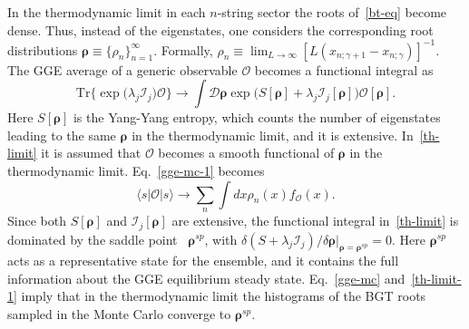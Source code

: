 \documentclass[twocolumn,superscriptaddress,prb,10pt]{revtex4-1}
\begin{document}
In the thermodynamic limit in each $n$-string sector the roots of~\eqref{bt-eq} become 
dense. Thus, instead of the eigenstates, one considers the corresponding root 
distributions $\pmb{\rho}\equiv\{\rho_n\}_{n=1}^\infty$. Formally, $\rho_n\equiv
\lim_{L\to\infty}[L(x_{n;\gamma+1}-x_{n;\gamma})]^{-1}$. The GGE average of a 
generic observable ${\mathcal O}$ becomes a functional integral as~\cite{yang-1969,mossel-2012} 
%
\begin{equation}
\label{th-limit}
\textrm{Tr}\big\{\exp\big({\lambda_j{\mathcal I}_j}\big){\mathcal O}\big\}
\rightarrow\int{\mathcal D}\pmb{\rho}\exp\big(S[\pmb{\rho}]+
\lambda_j{\mathcal I}_j[\pmb{\rho}]\big){\mathcal O}[\pmb{\rho}].
\end{equation}
%
Here $S[\pmb{\rho}]$ is the Yang-Yang entropy, which counts the number of eigenstates 
leading to the same $\pmb{\rho}$ in the thermodynamic limit, and it is extensive. 
In~\eqref{th-limit} it is assumed that ${\mathcal O}$ becomes a smooth functional 
of $\pmb{\rho}$ in the thermodynamic limit. Eq.~\eqref{gge-mc-1} becomes 
%
\begin{equation}
\label{th-limit-1}
\langle s|{\mathcal O}|s\rangle\to\sum\limits_{n}\int dx\rho_n(x)f_{{\mathcal O}}(x).
\end{equation}
%
Since both $S[\pmb{\rho}]$ and ${\mathcal I}_j[\pmb{\rho}]$ are extensive, the functional 
integral in~\eqref{th-limit} is dominated by the saddle point~\cite{mossel-2012} 
$\pmb{\rho}^{sp}$, with $\delta(S+\lambda_j{\mathcal I}_j)/\delta\pmb{\rho}|_{\pmb{\rho}=
\pmb{\rho}^{sp}}=0$. Here $\pmb{\rho}^{sp}$ acts as a representative 
state for the ensemble, and it contains the full information about the GGE equilibrium steady 
state. Eq.~\eqref{gge-mc} and~\eqref{th-limit-1} imply that in the thermodynamic limit 
the histograms of the BGT roots sampled in the Monte Carlo converge to $\pmb{\rho}^{sp}$.  
\end{document}

